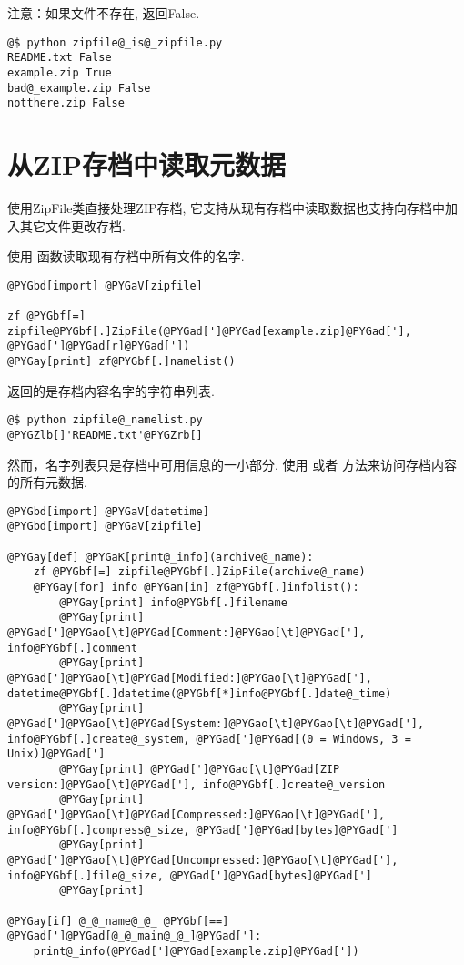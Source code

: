 \documentclass[a4paper,10pt,english]{manual}
\begin{document}
注意：如果文件不存在,  返回False.

\begin{Verbatim}[commandchars=@\[\]]
@$ python zipfile@_is@_zipfile.py
README.txt False
example.zip True
bad@_example.zip False
notthere.zip False
\end{Verbatim}


\section{从ZIP存档中读取元数据}

使用ZipFile类直接处理ZIP存档, 它支持从现有存档中读取数据也支持向存档中加入其它文件更改存档.

使用  函数读取现有存档中所有文件的名字.

\begin{Verbatim}[commandchars=@\[\]]
@PYGbd[import] @PYGaV[zipfile]

zf @PYGbf[=] zipfile@PYGbf[.]ZipFile(@PYGad[']@PYGad[example.zip]@PYGad['], @PYGad[']@PYGad[r]@PYGad['])
@PYGay[print] zf@PYGbf[.]namelist()
\end{Verbatim}

返回的是存档内容名字的字符串列表.

\begin{Verbatim}[commandchars=@\[\]]
@$ python zipfile@_namelist.py
@PYGZlb[]'README.txt'@PYGZrb[]
\end{Verbatim}

然而，名字列表只是存档中可用信息的一小部分, 使用  或者  方法来访问存档内容的所有元数据.

\begin{Verbatim}[commandchars=@\[\]]
@PYGbd[import] @PYGaV[datetime]
@PYGbd[import] @PYGaV[zipfile]

@PYGay[def] @PYGaK[print@_info](archive@_name):
    zf @PYGbf[=] zipfile@PYGbf[.]ZipFile(archive@_name)
    @PYGay[for] info @PYGan[in] zf@PYGbf[.]infolist():
        @PYGay[print] info@PYGbf[.]filename
        @PYGay[print] @PYGad[']@PYGao[\t]@PYGad[Comment:]@PYGao[\t]@PYGad['], info@PYGbf[.]comment
        @PYGay[print] @PYGad[']@PYGao[\t]@PYGad[Modified:]@PYGao[\t]@PYGad['], datetime@PYGbf[.]datetime(@PYGbf[*]info@PYGbf[.]date@_time)
        @PYGay[print] @PYGad[']@PYGao[\t]@PYGad[System:]@PYGao[\t]@PYGao[\t]@PYGad['], info@PYGbf[.]create@_system, @PYGad[']@PYGad[(0 = Windows, 3 = Unix)]@PYGad[']
        @PYGay[print] @PYGad[']@PYGao[\t]@PYGad[ZIP version:]@PYGao[\t]@PYGad['], info@PYGbf[.]create@_version
        @PYGay[print] @PYGad[']@PYGao[\t]@PYGad[Compressed:]@PYGao[\t]@PYGad['], info@PYGbf[.]compress@_size, @PYGad[']@PYGad[bytes]@PYGad[']
        @PYGay[print] @PYGad[']@PYGao[\t]@PYGad[Uncompressed:]@PYGao[\t]@PYGad['], info@PYGbf[.]file@_size, @PYGad[']@PYGad[bytes]@PYGad[']
        @PYGay[print]

@PYGay[if] @_@_name@_@_ @PYGbf[==] @PYGad[']@PYGad[@_@_main@_@_]@PYGad[']:
    print@_info(@PYGad[']@PYGad[example.zip]@PYGad['])
\end{Verbatim}
\end{document}
